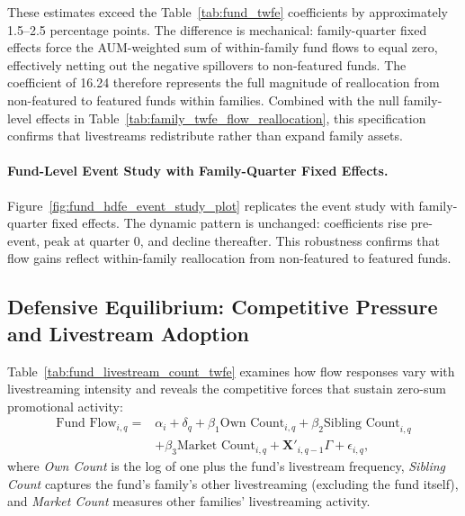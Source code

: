 \documentclass[12pt]{article}
\begin{document}
These estimates exceed the Table~\ref{tab:fund_twfe} coefficients by approximately 1.5--2.5 percentage points. The difference is mechanical: family-quarter fixed effects force the AUM-weighted sum of within-family fund flows to equal zero, effectively netting out the negative spillovers to non-featured funds. The coefficient of 16.24 therefore represents the full magnitude of reallocation from non-featured to featured funds within families. Combined with the null family-level effects in Table~\ref{tab:family_twfe_flow_reallocation}, this specification confirms that livestreams redistribute rather than expand family assets.

\paragraph{Fund-Level Event Study with Family-Quarter Fixed Effects.} Figure~\ref{fig:fund_hdfe_event_study_plot} replicates the event study with family-quarter fixed effects. The dynamic pattern is unchanged: coefficients rise pre-event, peak at quarter 0, and decline thereafter. This robustness confirms that flow gains reflect within-family reallocation from non-featured to featured funds.

\subsection{Defensive Equilibrium: Competitive Pressure and Livestream Adoption}\label{subsec:livestream_intensity}

Table~\ref{tab:fund_livestream_count_twfe} examines how flow responses vary with livestreaming intensity and reveals the competitive forces that sustain zero-sum promotional activity:
\begin{equation}
    \label{eq:fund_intensity}
    \begin{split}
        \text{Fund Flow}_{i,q} = & \alpha_i + \delta_q + \beta_1 \text{Own Count}_{i,q} + \beta_2 \text{Sibling Count}_{i,q} \\
                                 & + \beta_3 \text{Market Count}_{i,q} + \mathbf{X}'_{i,q-1} \Gamma + \epsilon_{i,q},
    \end{split}
\end{equation}
where \textit{Own Count} is the log of one plus the fund's livestream frequency, \textit{Sibling Count} captures the fund's family's other livestreaming (excluding the fund itself), and \textit{Market Count} measures other families' livestreaming activity.
\end{document}
